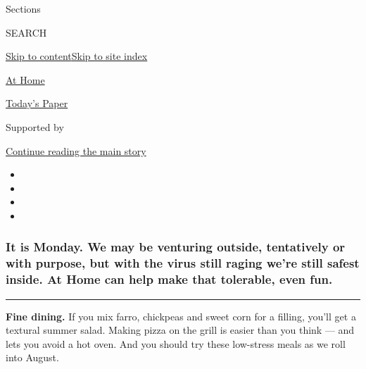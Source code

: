 Sections

SEARCH

\protect\hyperlink{site-content}{Skip to
content}\protect\hyperlink{site-index}{Skip to site index}

\href{https://www.nytimes.com/spotlight/at-home}{At Home}

\href{https://myaccount.nytimes.com/auth/login?response_type=cookie\&client_id=vi}{}

\href{https://www.nytimes.com/section/todayspaper}{Today's Paper}

Supported by

\protect\hyperlink{after-sponsor}{Continue reading the main story}

\begin{itemize}
\item
\item
\item
\item
\end{itemize}

\hypertarget{it-is-monday-we-may-be-venturing-outside-tentatively-or-with-purpose-but-with-the-virus-still-raging-were-still-safest-inside-at-home-can-help-make-that-tolerable-even-fun}{%
\subsubsection{\texorpdfstring{\textbf{It is Monday.} We may be
venturing outside, tentatively or with purpose, but with the virus still
raging we're still safest inside. \textbf{At Home} can help make that
tolerable, even
fun.}{It is Monday. We may be venturing outside, tentatively or with purpose, but with the virus still raging we're still safest inside. At Home can help make that tolerable, even fun.}}\label{it-is-monday-we-may-be-venturing-outside-tentatively-or-with-purpose-but-with-the-virus-still-raging-were-still-safest-inside-at-home-can-help-make-that-tolerable-even-fun}}

\begin{center}\rule{0.5\linewidth}{\linethickness}\end{center}

\textbf{Fine dining.} If you mix farro, chickpeas and sweet corn for a
filling, you'll get a textural summer salad. Making pizza on the grill
is easier than you think --- and lets you avoid a hot oven. And you
should try these low-stress meals as we roll into August.

\href{https://www.nytimes.com/2020/07/31/dining/farro-corn-chickpea-salad-recipe.html?action=click\&module=RelatedLinks\&pgtype=collection}{}

